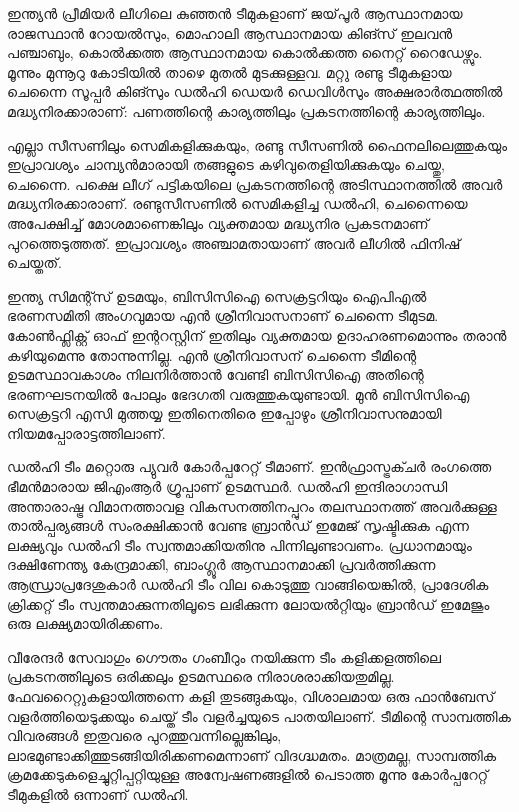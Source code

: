 \vskip 2pt

ഇന്ത്യന്‍ പ്രീമിയര്‍ ലീഗിലെ കുഞ്ഞന്‍ ടീമുകളാണ് ജയ്‌പൂര്‍ ആസ്ഥാനമായ രാജസ്ഥാന്‍ റോയല്‍സും, മൊഹാലി 
ആസ്ഥാനമായ കിങ്സ് ഇലവന്‍ പഞ്ചാബും, കൊല്‍ക്കത്ത ആസ്ഥാനമായ കൊല്‍ക്കത്ത നൈറ്റ് റൈഡേഴ്സും. 
മൂന്നും മുന്നൂറു കോടിയില്‍ താഴെ മുതല്‍ മുടക്കുള്ളവ. മറ്റു രണ്ടു ടീമുകളായ ചെന്നൈ സൂപ്പര്‍ കിങ്സും ഡല്‍ഹി ഡെയര്‍ 
ഡെവിള്‍സും അക്ഷരാര്‍ത്ഥത്തില്‍ മദ്ധ്യനിരക്കാരാണ്: പണത്തിന്റെ കാര്യത്തിലും പ്രകടനത്തിന്റെ കാര്യത്തിലും.

എല്ലാ സീസണിലും സെമികളിക്കുകയും, രണ്ടു സീസണില്‍ ഫൈനലിലെത്തുകയും ഇപ്രാവശ്യം ചാമ്പ്യന്‍മാരായി തങ്ങളുടെ 
കഴിവുതെളിയിക്കുകയും ചെയ്തു, ചെന്നൈ. പക്ഷെ ലീഗ് പട്ടികയിലെ പ്രകടനത്തിന്റെ അടിസ്ഥാനത്തില്‍ അവര്‍ 
മദ്ധ്യനിരക്കാരാണ്. രണ്ടുസീസണില്‍ സെമികളിച്ച ഡല്‍ഹി, ചെന്നൈയെ അപേക്ഷിച്ച് മോശമാണെങ്കിലും വ്യക്തമായ 
മദ്ധ്യനിര പ്രകടനമാണ് പുറത്തെടുത്തത്. ഇപ്രാവശ്യം അഞ്ചാമതായാണ് അവര്‍ ലീഗില്‍ ഫിനിഷ് ചെയ്തത്.

ഇന്ത്യ സിമന്റ്സ് ഉടമയും, ബിസിസിഐ സെക്രട്ടറിയും ഐപിഎല്‍ ഭരണസമിതി അംഗവുമായ എന്‍ ശ്രീനിവാസനാണ് 
ചെന്നൈ ടീമുടമ. കോണ്‍ഫ്ലിക്റ്റ് ഓഫ് ഇന്ററസ്റ്റിന് ഇതിലും വ്യക്തമായ ഉദാഹരണമൊന്നും തരാന്‍ കഴിയുമെന്നു തോന്നുന്നില്ല.
എന്‍ ശ്രീനിവാസന് ചെന്നൈ ടീമിന്റെ ഉടമസ്ഥാവകാശം നിലനിര്‍ത്താന്‍ വേണ്ടി ബിസിസിഐ അതിന്റെ ഭരണഘടനയില്‍ 
പോലും ഭേദഗതി വരുത്തുകയുണ്ടായി. മുന്‍ ബിസിസിഐ സെക്രട്ടറി എസി മുത്തയ്യ ഇതിനെതിരെ ഇപ്പോഴും ശ്രീനിവാസനുമായി 
നിയമപ്പോരാട്ടത്തിലാണ്.

ഡല്‍ഹി ടീം മറ്റൊരു പ്യുവര്‍ കോര്‍പ്പറേറ്റ് ടീമാണ്. ഇന്‍ഫ്രാസ്ട്രക്ചര്‍ രംഗത്തെ ഭീമന്‍മാരായ ജിഎംആര്‍ ഗ്രൂപ്പാണ് ഉടമസ്ഥര്‍. 
ഡല്‍ഹി ഇന്ദിരാഗാന്ധി അന്താരാഷ്ട്ര വിമാനത്താവള വികസനത്തിനപ്പുറം തലസ്ഥാനത്ത് അവര്‍ക്കുള്ള താല്‍പ്പര്യങ്ങള്‍ 
സംരക്ഷിക്കാന്‍ വേണ്ട ബ്രാന്‍ഡ് ഇമേജ് സൃഷ്ടിക്കുക എന്ന ലക്ഷ്യവും ഡല്‍ഹി ടീം സ്വന്തമാക്കിയതിനു പിന്നിലുണ്ടാവണം. 
പ്രധാനമായും ദക്ഷിണേന്ത്യ കേന്ദ്രമാക്കി, ബാംഗ്ലൂര്‍ ആസ്ഥാനമാക്കി പ്രവര്‍ത്തിക്കുന്ന ആന്ധ്രാപ്രദേശുകാര്‍ ഡല്‍ഹി ടീം വില 
കൊടുത്തു വാങ്ങിയെങ്കില്‍, പ്രാദേശിക ക്രിക്കറ്റ് ടീം സ്വന്തമാക്കുന്നതിലൂടെ ലഭിക്കുന്ന ലോയല്‍റ്റിയും ബ്രാന്‍ഡ് ഇമേജും ഒരു 
ലക്ഷ്യമായിരിക്കണം.

വീരേന്ദര്‍ സേവാഗും ഗൌതം ഗംബീറും നയിക്കുന്ന ടീം കളിക്കളത്തിലെ പ്രകടനത്തിലൂടെ ഒരിക്കലും ഉടമസ്ഥരെ 
നിരാശരാക്കിയതുമില്ല. ഫേവറൈറ്റുകളായിത്തന്നെ കളി തുടങ്ങുകയും, വിശാലമായ ഒരു ഫാന്‍ബേസ് വളര്‍ത്തിയെടുക്കയും 
ചെയ്ത് ടീം വളര്‍ച്ചയുടെ പാതയിലാണ്. ടീമിന്റെ സാമ്പത്തിക വിവരങ്ങള്‍ ഇതുവരെ പുറത്തുവന്നില്ലെങ്കിലും, 
ലാഭമുണ്ടാക്കിത്തുടങ്ങിയിരിക്കണമെന്നാണ് വിദഗ്ദ്ധമതം. മാത്രമല്ല, സാമ്പത്തിക ക്രമക്കേടുകളെച്ചുറ്റിപ്പറ്റിയുള്ള 
അന്വേഷണങ്ങളില്‍ പെടാത്ത മൂന്നു കോര്‍പ്പറേറ്റ് ടീമുകളില്‍ ഒന്നാണ് ഡല്‍ഹി.

